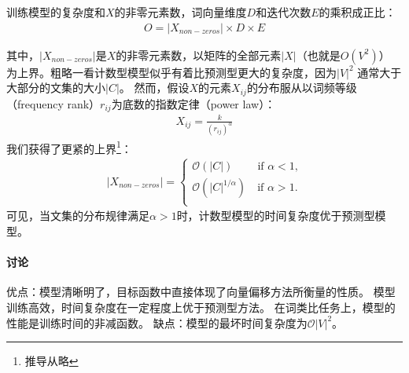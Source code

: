 训练模型的复杂度和$X$的非零元素数，词向量维度$D$和迭代次数$E$的乘积成正比：
\begin{align}
  O = |X_{non-zeros}| \times D \times E
  \label{eqn:glove-loose-bound}
\end{align}

其中，$|X_{non-zeros}|$是$X$的非零元素数，以矩阵的全部元素$|X|$（也就是$O(V^2)$）
为上界。粗略一看计数型模型似乎有着比预测型更大的复杂度，因为$|V|^2$
通常大于大部分的文集的大小$|C|$。
然而，假设$X$的元素$X_{ij}$的分布服从以词频等级（frequency rank）$r_{ij}$为底数的指数定律（power law）：
\begin{align}
  X_{ij} = \frac{k}{(r_{ij})^\alpha}
\end{align}
我们获得了更紧的上界\footnote{推导从略}：
\begin{align}
  |X_{non-zeros}| = \begin{cases}
    \mathcal{O}(|C|) \ \quad\quad\text{if $\alpha < 1$,} \\
    \mathcal{O}(|C|^{1/\alpha}) \quad\text{if $\alpha > 1$.} \\
  \end{cases}
  \label{eqn:glove-tight-bound}
\end{align}
可见，当文集的分布规律满足$\alpha > 1$时，计数型模型的时间复杂度优于预测型模型。

\paragraph{讨论}
优点：模型清晰明了，目标函数中直接体现了向量偏移方法所衡量的性质。
模型训练高效，时间复杂度在一定程度上优于预测型方法。
在词类比任务上，模型的性能是训练时间的非减函数\cite{pennington2014glove}。
缺点：模型的最坏时间复杂度为$\mathcal{O}{|V|^2}$。
